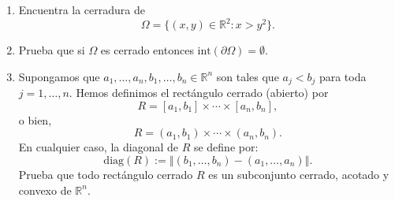 \documentclass[12pt]{article}
\newcommand{\norm}[1]{\left\Vert#1\right\Vert}
\newcommand{\diag}{\mathrm{diag}}
\newcommand{\Int}{\mathrm{int}}
\newcommand{\R}{\mathbb R}
\begin{document}
\begin{enumerate}
\item Encuentra la cerradura de 
\[ \Omega = \{ (x,y)\in \R^2 : x > y^2 \}. \]

\item Prueba que si $\Omega$ es cerrado entonces 
$\Int(\partial \Omega)=\emptyset$.

\item Supongamos que $a_1,\ldots,a_n,b_1,\ldots,b_n\in \R^n$ son tales que $a_j<b_j$ para toda $j=1,\ldots,n$. Hemos definimos el rectángulo cerrado (abierto) por
\[ R = [a_1,b_1]\times \cdots\times [a_n,b_n], \]
o bien,
\[ R = (a_1,b_1)\times \cdots\times (a_n,b_n). \]
En cualquier caso, la \textsf{diagonal} de $R$ se define por:
\[ \diag(R) := \norm{(b_1,\ldots,b_n) - (a_1,\ldots,a_n)}. \]
Prueba que todo rectángulo cerrado $R$ es un subconjunto cerrado, acotado y convexo de $\R^n$. 

\end{enumerate}
\end{document}
